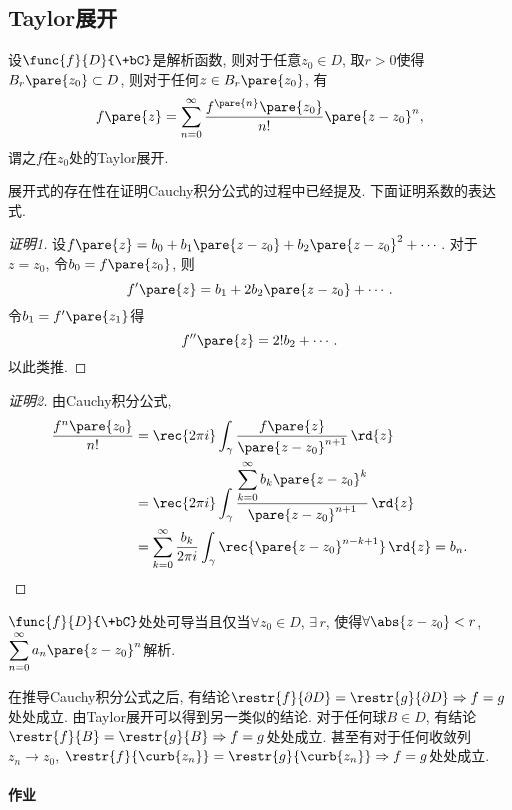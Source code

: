 \documentclass[../ComplexVariable.tex]{subfiles}
\begin{document}

\subsection{Taylor展开} %
\label{sub:taylor展开}

\begin{theorem}
    设$\func{f}{D}{\+bC}$是解析函数, 则对于任意$z_0\in D$, 取$r>0$使得$B_r\pare{z_0}\subset D$, 则对于任何$z\in B_r\pare{z_0}$, 有
    \[ f\pare{z} = \sum_{n=0}^\infty \frac{f^{\pare{n}}\pare{z_0}}{n!}\pare{z-z_0}^n, \]
    谓之$f$在$z_0$处的Taylor展开.
\end{theorem}
展开式的存在性在证明Cauchy积分公式的过程中已经提及. 下面证明系数的表达式.
\begin{proof}[证明1]
    设$f\pare{z} = b_0 + b_1\pare{z-z_0} + b_2\pare{z-z_0}^2+\cdots$. 对于$z=z_0$, 令$b_0 = f\pare{z_0}$, 则
    \[ f'\pare{z} = b_1 + 2b_2\pare{z-z_0} + \cdots. \]
    令$b_1 = f'\pare{z_1}$得
    \[ f''\pare{z} = 2! b_2 + \cdots. \]
    以此类推.
\end{proof}
\begin{proof}[证明2]
    由Cauchy积分公式,
    \begin{align*}
        \frac{f^{n}\pare{z_0}}{n!} &= \rec{2\pi i} \int_\gamma \frac{f\pare{z}}{\pare{z-z_0}^{n+1}}\,\rd{z} \\
        &= \rec{2\pi i} \int_\gamma \frac{\displaystyle \sum_{k=0}^\infty b_k\pare{z-z_0}^k}{\pare{z-z_0}^{n+1}}\,\rd{z} \\
        &= \sum_{k=0}^\infty \frac{b_k}{2\pi i} \int_\gamma \rec{\pare{z-z_0}^{n-k+1}}\,\rd{z} = b_n. \qedhere
    \end{align*}
\end{proof}
\begin{theorem}
    $\func{f}{D}{\+bC}$处处可导当且仅当$\forall z_0\in D$, $\exists\, r$, 使得$\forall \abs{z-z_0}<r$, $
    \displaystyle \sum_{n=0}^\infty a_n\pare{z-z_0}^n$解析.
\end{theorem}
在推导Cauchy积分公式之后, 有结论$\restr{f}{\partial D} = \restr{g}{\partial D}\Rightarrow f = g$处处成立. 由Taylor展开可以得到另一类似的结论. 对于任何球$B\in D$, 有结论$\restr{f}{B} = \restr{g}{B}\Rightarrow f = g$处处成立. 甚至有对于任何收敛列$z_n\rightarrow z_0$, $\restr{f}{\curb{z_n}} = \restr{g}{\curb{z_n}}\Rightarrow f = g$处处成立.

\paragraph{作业} %
\label{par:作业}
\end{document}
